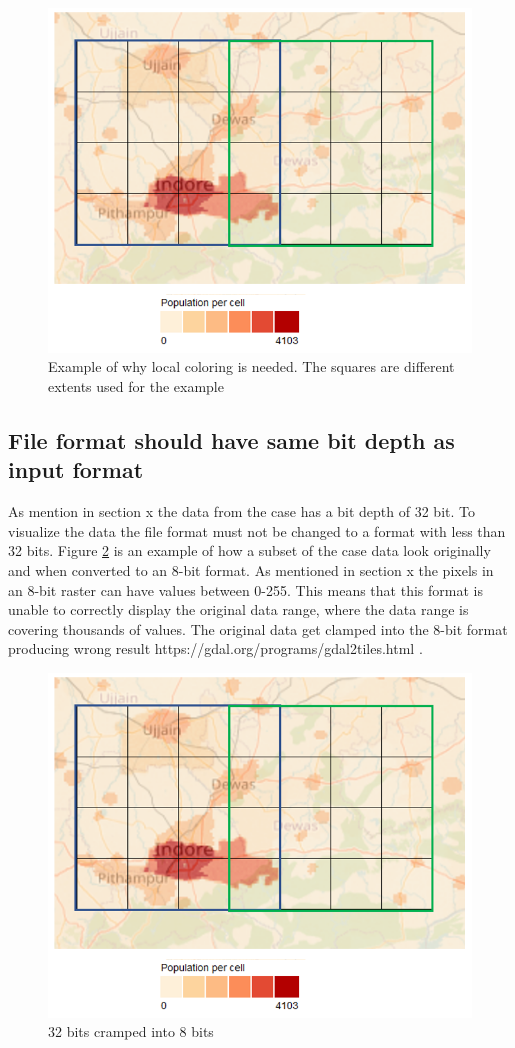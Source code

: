 \begin{figure} [H]
	\centering
	\includegraphics[width=.8\textwidth]{Pictures/WhyColorLocallyMap}
	\caption{Example of why local coloring is needed. The squares are different extents used for the example}
	\label{WhyColorLocallyMap}
\end{figure}

\subsection{File format should have same bit depth as input format}
As mention in section x the data from the case has a bit depth of 32 bit. To visualize the data the file format must not be changed to a format with less than 32 bits. Figure \ref{WhyColorLocallyMap} is an example of how a subset of the case data look originally and when converted to an 8-bit format. As mentioned in section x the pixels in an 8-bit raster can have values between 0-255. This means that this format is unable to correctly display the original data range, where the data range is covering thousands of values. The original data get clamped into the 8-bit format producing wrong result
https://gdal.org/programs/gdal2tiles.html .

\begin{figure} [H]
	\centering
	\includegraphics[width=.8\textwidth]{Pictures/WhyColorLocallyMap}
	\caption{32 bits cramped into 8 bits}
	\label{WhyColorLocallyMap}
\end{figure}

